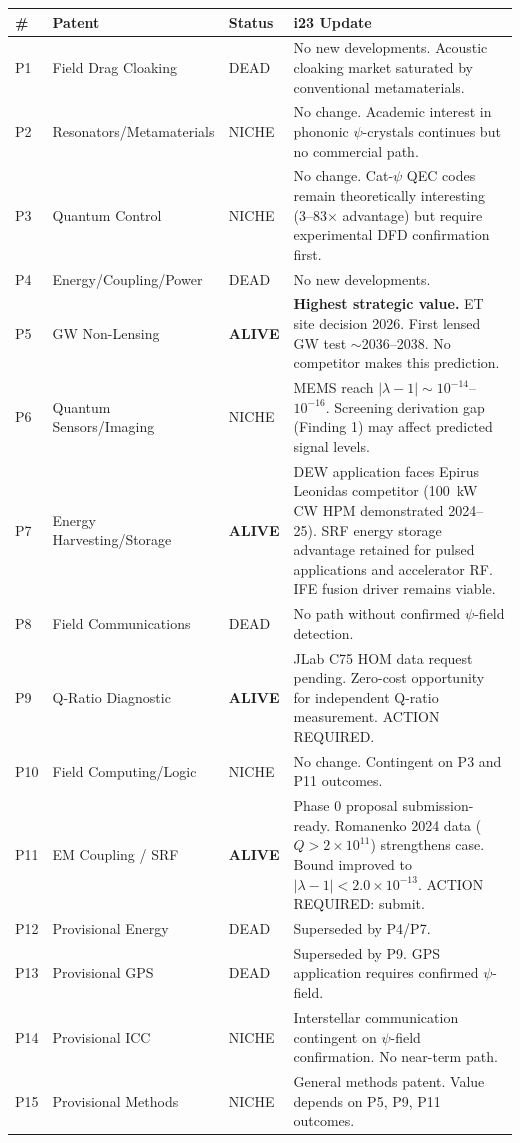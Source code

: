 \documentclass[11pt]{article}
\newcommand{\ee}[1]{\times 10^{#1}}
\begin{document}
\begin{longtable}{p{0.5cm}p{3.5cm}p{2cm}p{5.5cm}}
\toprule
\textbf{\#} & \textbf{Patent} & \textbf{Status} & \textbf{i23 Update} \\
\midrule
\endhead
P1 & Field Drag Cloaking & DEAD & No new developments.  Acoustic
  cloaking market saturated by conventional metamaterials. \\
P2 & Resonators/Metamaterials & NICHE & No change.  Academic interest
  in phononic $\psi$-crystals continues but no commercial path. \\
P3 & Quantum Control & NICHE & No change.  Cat-$\psi$ QEC codes
  remain theoretically interesting (3--83$\times$ advantage) but
  require experimental DFD confirmation first. \\
P4 & Energy/Coupling/Power & DEAD & No new developments. \\
P5 & GW Non-Lensing & \textbf{ALIVE} & \textbf{Highest strategic value.}
  ET site decision 2026. First lensed GW test $\sim$2036--2038.
  No competitor makes this prediction. \\
P6 & Quantum Sensors/Imaging & NICHE & MEMS reach $|\lambda-1| \sim
  10^{-14}$--$10^{-16}$.  Screening derivation gap (Finding 1) may
  affect predicted signal levels. \\
P7 & Energy Harvesting/Storage & \textbf{ALIVE} & DEW application
  faces Epirus Leonidas competitor (100~kW CW HPM demonstrated 2024--25).
  SRF energy storage advantage retained for pulsed applications and
  accelerator RF.  IFE fusion driver remains viable. \\
P8 & Field Communications & DEAD & No path without confirmed
  $\psi$-field detection. \\
P9 & Q-Ratio Diagnostic & \textbf{ALIVE} & JLab C75 HOM data request
  pending.  Zero-cost opportunity for independent Q-ratio measurement.
  ACTION REQUIRED. \\
P10 & Field Computing/Logic & NICHE & No change.  Contingent on P3
  and P11 outcomes. \\
P11 & EM Coupling / SRF & \textbf{ALIVE} & Phase 0 proposal
  submission-ready.  Romanenko 2024 data ($Q > 2\ee{11}$) strengthens
  case.  Bound improved to $|\lambda-1| < 2.0\ee{-13}$.  ACTION
  REQUIRED: submit. \\
P12 & Provisional Energy & DEAD & Superseded by P4/P7. \\
P13 & Provisional GPS & DEAD & Superseded by P9.  GPS application
  requires confirmed $\psi$-field. \\
P14 & Provisional ICC & NICHE & Interstellar communication contingent
  on $\psi$-field confirmation.  No near-term path. \\
P15 & Provisional Methods & NICHE & General methods patent.  Value
  depends on P5, P9, P11 outcomes. \\
\bottomrule
\end{longtable}
\end{document}

